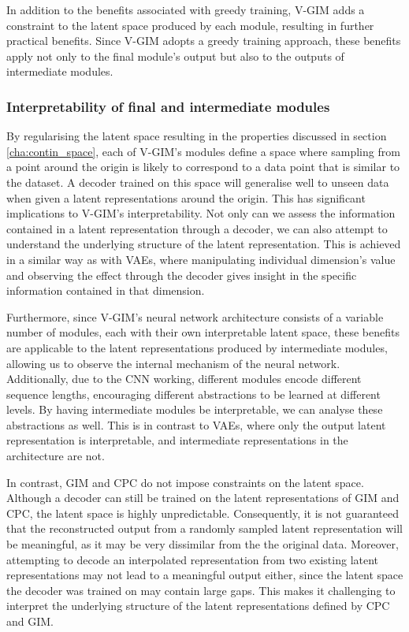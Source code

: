 	In addition to the benefits associated with greedy training, V-GIM adds a constraint to the latent space produced by each module, resulting in further practical benefits. Since V-GIM adopts a greedy training approach, these benefits apply not only to the final module's output but also to the outputs of intermediate modules.
	

	\subsubsection{Interpretability of final and intermediate modules}
		By regularising the latent space resulting in the properties discussed in section \ref{cha:contin_space}, each of V-GIM's modules define a space where sampling from a point around the origin is likely to correspond to a data point that is similar to the dataset. A decoder trained on this space will generalise well to unseen data when given a latent representations around the origin. This has significant implications to V-GIM's interpretability. Not only can we assess the information contained in a latent representation through a decoder, we can also attempt to understand the underlying structure of the latent representation. This is achieved in a similar way as with VAEs, where manipulating individual dimension's value and observing the effect through the decoder gives insight in the specific information contained in that dimension.
		
		Furthermore, since V-GIM's neural network architecture consists of a variable number of modules, each with their own interpretable latent space, these benefits are applicable to the latent representations produced by intermediate modules, allowing us to observe the internal mechanism of the neural network. Additionally, due to the CNN working, different modules encode different sequence lengths, encouraging different abstractions to be learned at different levels. By having intermediate modules be interpretable, we can analyse these abstractions as well. This is in contrast to VAEs, where only the output latent representation is interpretable, and intermediate representations in the architecture are not.
		
		In contrast, GIM and CPC do not impose constraints on the latent space. Although a decoder can still be trained on the latent representations of GIM and CPC, the latent space is highly unpredictable. Consequently, 
		it is not guaranteed that the reconstructed output from a randomly sampled latent representation will be meaningful, as it may be very dissimilar from the the original data. Moreover, attempting to decode an interpolated representation from two existing latent representations may not lead to a meaningful output either, since the latent space the decoder was trained on may contain large gaps. This makes it challenging to interpret the underlying structure of the latent representations defined by CPC and GIM.

